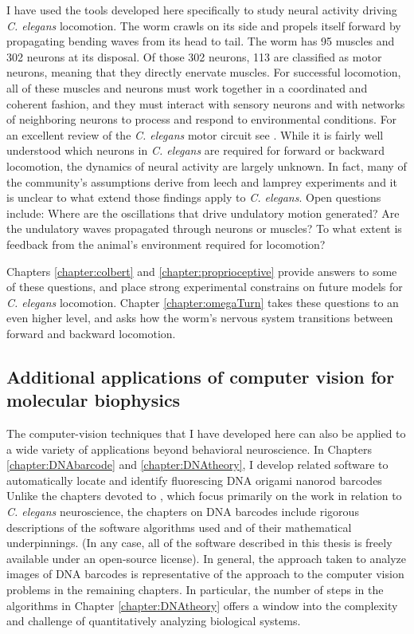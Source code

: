 I have used the tools developed here specifically to study neural activity driving \emph{C. elegans} locomotion. The worm crawls on its side and propels itself forward by propagating bending waves from its head to tail.  The worm has 95 muscles and 302 neurons at its disposal. Of those 302 neurons, 113 are classified as motor neurons, meaning that they directly enervate muscles. For successful locomotion, all of these muscles and neurons must work together in a coordinated and coherent fashion, and they must interact with sensory neurons and with networks of neighboring neurons to process and respond to environmental conditions. For an excellent review of the \textit{C. elegans}  motor circuit see \citep{von_stetina_motor_2006}. While it is fairly well understood which neurons  in \textit{C. elegans} are required for forward or backward locomotion, the dynamics of neural activity are largely unknown. In fact, many of the community's assumptions derive from leech and lamprey experiments \citep{friesen_sensory_2001, karbowski_systems_2008} and it is unclear to what extend those findings apply to \textit{C. elegans}. Open questions include: Where are the oscillations that drive undulatory motion generated? Are the undulatory waves propagated through neurons or muscles? To what extent is  feedback from the animal's environment required for locomotion? 

Chapters \ref{chapter:colbert} and \ref{chapter:proprioceptive} provide answers to some of these questions, and place strong experimental constrains on future models for \textit{C. elegans} locomotion.  Chapter \ref{chapter:omegaTurn} takes these questions to an even higher level, and asks how the worm's nervous system transitions between forward and backward locomotion. 



\subsection{Additional applications of computer vision for molecular biophysics}
The computer-vision techniques that I have developed here can also be applied to a wide variety of applications beyond behavioral neuroscience. In Chapters \ref{chapter:DNAbarcode} and \ref{chapter:DNAtheory}, I develop related software to automatically locate and identify fluorescing DNA origami nanorod barcodes  Unlike the chapters devoted to , which focus primarily on the work in relation to \textit{C. elegans} neuroscience, the chapters on DNA barcodes include rigorous descriptions of the software algorithms used and of their mathematical underpinnings. (In any case, all of the software described in this thesis is freely available under an open-source license).   In general, the approach taken to analyze images of DNA barcodes is representative of the approach to the computer vision problems in the remaining chapters. In particular, the number of steps in the algorithms in Chapter \ref{chapter:DNAtheory} offers a window into the complexity and challenge of quantitatively analyzing biological systems. 


